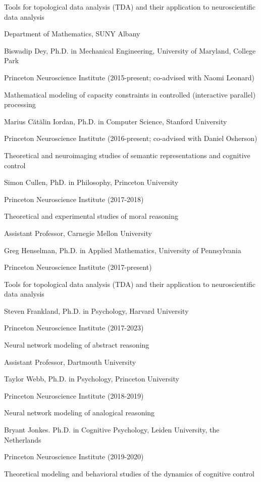 \documentclass[10 pt]{article}
\begin{document}
Tools for topological data analysis (TDA) and their application to neuroscientific data analysis

Department of Mathematics, SUNY Albany
    \medskip

Biswadip Dey, Ph.D. in Mechanical Engineering, University of Maryland, College Park

Princeton Neuroscience Institute (2015-present; co-advised with Naomi Leonard)

Mathematical modeling of capacity constraints in controlled (interactive parallel) processing
    \medskip

Marius Cătălin Iordan, Ph.D. in Computer Science, Stanford University

Princeton Neuroscience Institute (2016-present; co-advised with Daniel Osherson)

Theoretical and neuroimaging studies of semantic representations and cognitive control
    \medskip

Simon Cullen, PhD. in Philosophy, Princeton University

Princeton Neuroscience Institute (2017-2018)

Theoretical and experimental studies of moral reasoning

Assistant Professor, Carnegie Mellon University
    \medskip

Greg Henselman, Ph.D. in Applied Mathematics, University of Pennsylvania

Princeton Neuroscience Institute (2017-present)

Tools for topological data analysis (TDA) and their application to neuroscientific data analysis
    \medskip

Steven Frankland, Ph.D. in Psychology, Harvard University

Princeton Neuroscience Institute (2017-2023)

Neural network modeling of abstract reasoning

Assistant Professor, Dartmouth University
    \medskip

Taylor Webb, Ph.D. in Psychology, Princeton University

Princeton Neuroscience Institute (2018-2019)

Neural network modeling of analogical reasoning
    \medskip

Bryant Jonkes. Ph.D. in Cognitive Psychology, Leiden University, the Netherlands

Princeton Neuroscience Institute (2019-2020)

Theoretical modeling and behavioral studies of the dynamics of cognitive control
\end{document}
